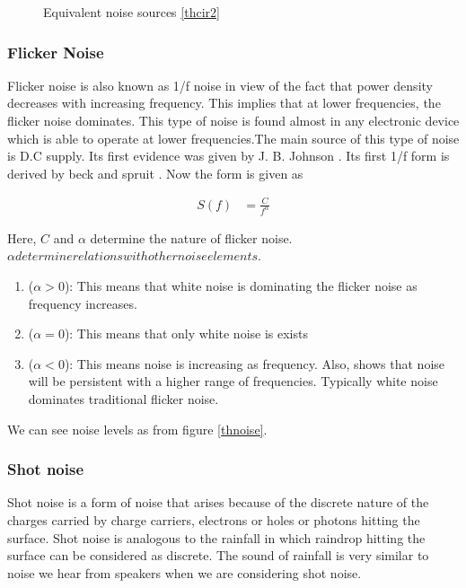 \documentclass[final,5p,12pt,twocolumn]{elsaarticle}
\begin{document}
\begin{figure}[hbt!]
\caption{Equivalent noise sources \ref{thcir2} \label{thcir4}}
\end{figure}

\subsubsection{Flicker Noise \label{thflicker}}

Flicker noise is also known as 1/f noise in view of the fact that power density decreases with increasing frequency. This implies that at lower frequencies, the flicker noise dominates.
This type of noise is found  almost in any electronic device which is able to operate at lower frequencies.The main source of this type of noise is D.C supply. Its first evidence was given by J. B. Johnson \cite{j b johnson}. Its first 1/f form is derived by beck and spruit \cite{beck and spruit}. Now the form is given as 

\begin{align}
S(f) & = \frac{C}{f^{\alpha}}
\end{align}

Here, $C$ and $\alpha$ determine the nature of flicker noise. $\alpha determine relations with other noise elements$.

\begin{enumerate}
\item ($\alpha > 0$): This means that white noise is dominating the flicker noise as frequency increases.
\item ($\alpha = 0$): This means that only white noise is exists
\item ($\alpha < 0$): This means noise is increasing as frequency. Also, shows that noise will be persistent with a higher range of frequencies. Typically white noise dominates traditional flicker noise.
\end{enumerate}

We can see noise levels as from figure \ref{thnoise}.

\subsubsection{Shot noise \label{thshot}}

Shot noise is a form of noise that arises because of the discrete nature of the charges carried by charge carriers, electrons or holes or photons hitting the surface. Shot noise is analogous to the rainfall in which raindrop hitting the surface can be considered as discrete. The sound of rainfall is very similar to noise we hear from speakers when we are considering shot noise. 
\end{document}
